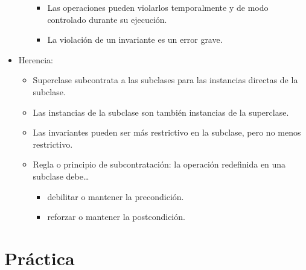 \documentclass[12pt, twoside, openright]{report} %
\begin{document}
\begin{itemize}
\begin{itemize}
        \begin{itemize}
        
        \item
          Las operaciones pueden violarlos temporalmente y de modo
          controlado durante su ejecución.
        \item
          La violación de un invariante es un error grave.
        \end{itemize}
      \end{itemize}

	  \item
      Herencia:

      \begin{itemize}
      
      \item
        Superclase subcontrata a las subclases para las instancias
        directas de la subclase.
      \item
        Las instancias de la subclase son también instancias de la
        superclase.
      \item
        Las invariantes pueden ser más restrictivo en la subclase, pero
        no menos restrictivo.
      \item
        Regla o principio de subcontratación: la operación redefinida en
        una subclase debe\ldots{}

        \begin{itemize}
			\item
			debilitar o mantener la precondición.
			\item
			reforzar o mantener la postcondición.
        \end{itemize}
      
      \end{itemize}
    \end{itemize}

\chapter{Práctica}
  
  
\end{document}
